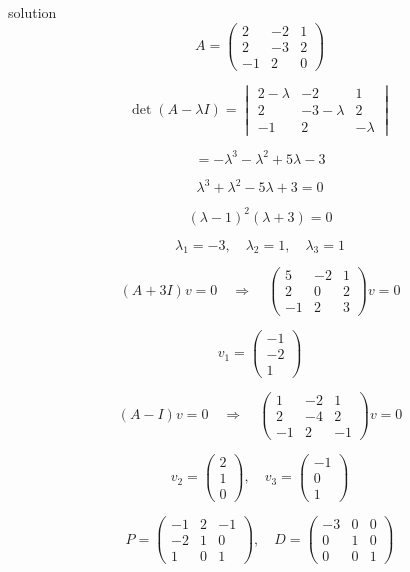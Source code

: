 \documentclass{beamer}
\begin{document}
\begin{frame}[allowframebreaks]{solution}
\[
A = \begin{pmatrix}
2 & -2 & 1 \\ 
2 & -3 & 2 \\ 
-1 & 2 & 0
\end{pmatrix}
\]

\[
\det(A-\lambda I) 
= \begin{vmatrix}
2-\lambda & -2 & 1 \\ 
2 & -3-\lambda & 2 \\ 
-1 & 2 & -\lambda
\end{vmatrix}
\]

\[
= -\lambda^{3} - \lambda^{2} + 5\lambda - 3
\]

\[
\lambda^{3} + \lambda^{2} - 5\lambda + 3 = 0
\]

\[
(\lambda-1)^{2}(\lambda+3)=0
\]

\[
\lambda_1 = -3, \quad \lambda_2 = 1, \quad \lambda_3 = 1
\]

\[
(A+3I)v=0 \quad \Rightarrow \quad 
\begin{pmatrix}
5 & -2 & 1\\
2 & 0 & 2\\
-1 & 2 & 3
\end{pmatrix}v=0
\]

\[
v_1 = \begin{pmatrix}-1 \\ -2 \\ 1\end{pmatrix}
\]

\[
(A-I)v=0 \quad \Rightarrow \quad
\begin{pmatrix}
1 & -2 & 1\\
2 & -4 & 2\\
-1 & 2 & -1
\end{pmatrix}v=0
\]

\[
v_2 = \begin{pmatrix}2 \\ 1 \\ 0\end{pmatrix}, \quad
v_3 = \begin{pmatrix}-1 \\ 0 \\ 1\end{pmatrix}
\]

\[
P = \begin{pmatrix}
-1 & 2 & -1 \\ 
-2 & 1 & 0 \\ 
1 & 0 & 1
\end{pmatrix}, \quad
D = \begin{pmatrix}
-3 & 0 & 0 \\ 
0 & 1 & 0 \\ 
0 & 0 & 1
\end{pmatrix}
\]


\end{frame}
\end{document}
